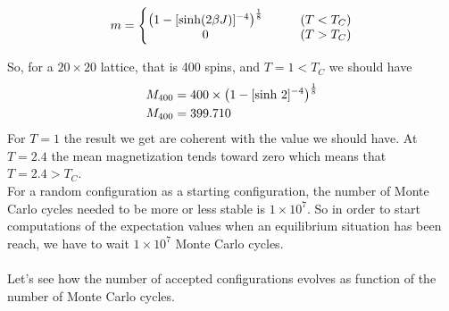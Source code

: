 \documentclass[a4paper, twoside, 11pt]{report}
\theoremstyle{theorem}
\theoremstyle{remark}
\theoremstyle{exemple}
\begin{document}
                \begin{equation*}
                    m = \left\{ \begin{matrix}
                              \left( 1-[\textnormal{sinh}(2\beta J)]^{-4} \right)^{\frac{1}{8}} & & & (T < T_C) \\
                              0 & & & (T>T_C)
                              \end{matrix}
                        \right.
                \end{equation*}
                
            So, for a $20 \times 20$ lattice, that is 400 spins, and $T=1<T_C$ we should have
                \begin{align*}
                    M_{400}&=400 \times \left(1-[\textnormal{sinh}\ 2]^{-4}\right)^{\frac{1}{8}}\\
                    M_{400}&=399.710
                \end{align*}
            For $T=1$ the result we get are coherent with the value we should have. At $T=2.4$ the mean magnetization tends toward zero which means that $T=2.4>T_C$. \\
            For a random configuration as a starting configuration, the number of Monte Carlo cycles needed to be more or less stable is $1\times 10^7$. So in order to start computations of the expectation values when an equilibrium situation has been reach, we have to wait $1 \times 10^7$ Monte Carlo cycles.
            
            \paragraph{}Let's see how the number of accepted configurations evolves as function of the number of Monte Carlo cycles. 
            
\end{document}
